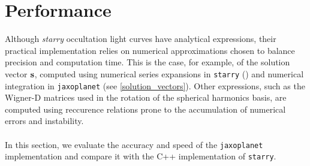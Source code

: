 \documentclass[modern]{aastex631}
\begin{document}
\section{Performance}\label{performances}
Although \textit{starry} occultation light curves have analytical expressions, their practical implementation relies on numerical approximations chosen to balance precision and computation time. This is the case, for example, of the solution vector ${\mathbf{s}}$, computed using numerical series expansions in \texttt{starry} (\citealt[section D.2.3]{starry}) and numerical integration in \texttt{jaxoplanet} (see \autoref{solution_vectors}). Other expressions, such as the Wigner-D matrices used in the rotation of the spherical harmonics basis, are computed using reccurence relations prone to the accumulation of numerical errors and instability.\\\\
In this section, we evaluate the accuracy and speed of the \texttt{jaxoplanet} implementation and compare it with the C++ implementation of \texttt{starry}.
\end{document}
